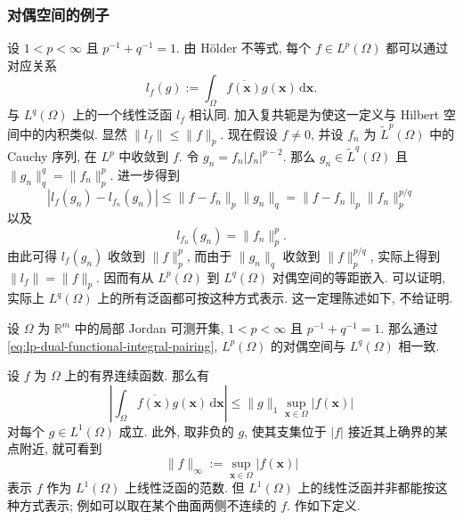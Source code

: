 \subsubsection{对偶空间的例子}\label{subsec:dual-space-examples}

\begin{Example}
\label{ex:lp-conjugate-exponent-dual-functional}
设 $1<p<\infty$ 且 $p^{-1}+q^{-1}=1$. 由 Hölder 不等式, 每个 $f\in L^p(\Omega)$ 都可以通过对应关系
\begin{equation}\label{eq:lp-dual-functional-integral-pairing}
l_f(g):=\int_\Omega\overline{f(\bm{x})}g(\bm{x})\,\mathrm{d}\bm{x}.
\end{equation}
与 $L^q(\Omega)$ 上的一个线性泛函 $l_f$ 相认同. 加入复共轭是为使这一定义与 Hilbert 空间中的内积类似. 显然 $\|l_f\|\leq\|f\|_p$. 现在假设 $f\ne0$, 并设 $f_n$ 为 $\widetilde L^p(\Omega)$ 中的 Cauchy 序列, 在 $L^p$ 中收敛到 $f$. 令 $g_n=f_n|f_n|^{p-2}$. 那么 $g_n\in\widetilde L^q(\Omega)$ 且 $\|g_n\|_q^q=\|f_n\|_p^p$. 进一步得到
\begin{equation}\label{eq:lp-dual-functional-approximating-norm-bound}
|l_f(g_n)-l_{f_n}(g_n)|\leq\|f-f_n\|_p\|g_n\|_q=\|f-f_n\|_p\|f_n\|_p^{p/q}
\end{equation}
以及
\begin{equation}\label{eq:lp-dual-functional-approximating-pairing-value}
l_{f_n}(g_n)=\|f_n\|_p^p.
\end{equation}
由此可得 $l_f(g_n)$ 收敛到 $\|f\|_p^p$, 而由于 $\|g_n\|_q$ 收敛到 $\|f\|_p^{p/q}$, 实际上得到 $\|l_f\|=\|f\|_p$. 因而有从 $L^p(\Omega)$ 到 $L^q(\Omega)$ 对偶空间的等距嵌入. 可以证明, 实际上 $L^q(\Omega)$ 上的所有泛函都可按这种方式表示. 这一定理陈述如下, 不给证明.
\end{Example}

\begin{Theorem}
\label{thm:lp-dual-space-representation}
设 $\Omega$ 为 $\mathbb{R}^m$ 中的局部 Jordan 可测开集, $1<p<\infty$ 且 $p^{-1}+q^{-1}=1$. 那么通过 \eqref{eq:lp-dual-functional-integral-pairing}, $L^p(\Omega)$ 的对偶空间与 $L^q(\Omega)$ 相一致.
\end{Theorem}

\begin{Example}
\label{ex:bounded-continuous-lp-one-dual}
设 $f$ 为 $\Omega$ 上的有界连续函数. 那么有
\begin{equation}\label{eq:bounded-continuous-lp-one-dual-estimate}
\left|\int_\Omega\overline{f(\bm{x})}g(\bm{x})\,\mathrm{d}\bm{x}\right|\leq\|g\|_1\sup_{\bm{x}\in\Omega}|f(\bm{x})|
\end{equation}
对每个 $g\in L^1(\Omega)$ 成立. 此外, 取非负的 $g$, 使其支集位于 $|f|$ 接近其上确界的某点附近, 就可看到
\begin{equation}\label{eq:bounded-continuous-infinity-norm}
\|f\|_\infty:=\sup_{\bm{x}\in\Omega}|f(\bm{x})|
\end{equation}
表示 $f$ 作为 $L^1(\Omega)$ 上线性泛函的范数. 但 $L^1(\Omega)$ 上的线性泛函并非都能按这种方式表示; 例如可以取在某个曲面两侧不连续的 $f$. 作如下定义.
\end{Example}

